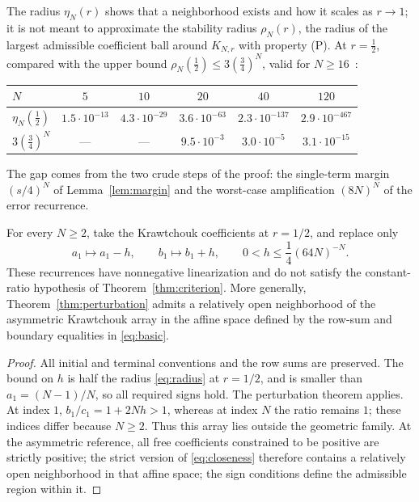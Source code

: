\begin{remark}\label{rem:size}
The radius $\eta_N(r)$ shows that a neighborhood exists and how it scales as $r\to1$; it is not meant to approximate the stability radius $\rho_N(r)$, the radius of the largest admissible coefficient ball around $K_{N,r}$ with property (P). At $r=\frac12$, compared with the upper bound $\rho_N(\frac12)\leq3(\frac34)^N$, valid for $N\geq16$~\cite[Corollary~]{P1}:
\begin{center}
\begin{tabular}{@{}lccccc@{}}
$N$&$5$&$10$&$20$&$40$&$120$\\\hline
$\eta_N(\frac12)$&$1.5\cdot10^{-13}$&$4.3\cdot10^{-29}$&$3.6\cdot10^{-63}$&$2.3\cdot10^{-137}$&$2.9\cdot10^{-467}$\\
$3(\frac34)^N$&---&---&$9.5\cdot10^{-3}$&$3.0\cdot10^{-5}$&$3.1\cdot10^{-15}$
\end{tabular}
\end{center}
The gap comes from the two crude steps of the proof: the single-term margin $(s/4)^N$ of Lemma~\ref{lem:margin} and the worst-case amplification $(8N)^N$ of the error recurrence.
\end{remark}

\begin{corollary}\label{cor:nonclassical}
For every $N\geq2$, take the Krawtchouk coefficients at $r=1/2$, and replace only
\[
a_1\longmapsto a_1-h,\qquad b_1\longmapsto b_1+h,
\qquad 0<h\leq\frac14(64N)^{-N}.
\]
These recurrences have nonnegative linearization and do not satisfy the constant-ratio hypothesis of Theorem~\ref{thm:criterion}. More generally, Theorem~\ref{thm:perturbation} admits a relatively open neighborhood of the asymmetric Krawtchouk array in the affine space defined by the row-sum and boundary equalities in \eqref{eq:basic}.
\end{corollary}
\begin{proof}
All initial and terminal conventions and the row sums are preserved. The bound on $h$ is half the radius \eqref{eq:radius} at $r=1/2$, and is smaller than $a_1=(N-1)/N$, so all required signs hold. The perturbation theorem applies. At index $1$, $b_1/c_1=1+2Nh>1$, whereas at index $N$ the ratio remains $1$; these indices differ because $N\geq2$. Thus this array lies outside the geometric family. At the asymmetric reference, all free coefficients constrained to be positive are strictly positive; the strict version of \eqref{eq:closeness} therefore contains a relatively open neighborhood in that affine space; the sign conditions define the admissible region within it.
\end{proof}

